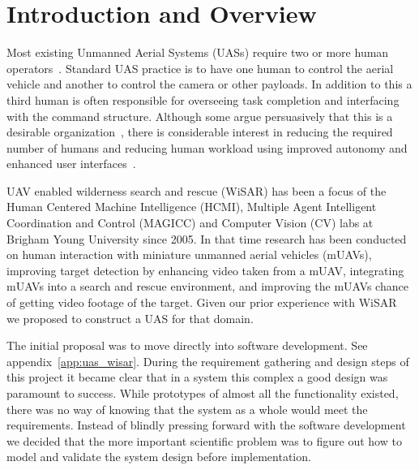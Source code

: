 \chapter{Introduction and Overview}

Most existing Unmanned Aerial Systems (UASs) require two or more human operators~\cite{GoodrichMorse2008,MurphyStoverPrattGriffin2006}. Standard UAS practice is to have one human to control the aerial vehicle and another to control the camera or other payloads. In addition to this a third human is often responsible for overseeing task completion and interfacing with the command structure. Although some argue persuasively that this is a desirable organization~\cite{MurphyBurke2010}, there is considerable interest in reducing the required number of humans and reducing human workload using improved autonomy and enhanced user interfaces~\cite{Cummings2007,MitchellCummings2005,goodrich2010fanout}.

UAV enabled wilderness search and rescue (WiSAR) has been a focus of the Human
Centered Machine Intelligence (HCMI), Multiple Agent Intelligent Coordination and Control (MAGICC) and Computer Vision (CV) labs at Brigham Young University since 2005.  In that time research has been conducted on human interaction with miniature unmanned aerial vehicles (mUAVs), improving target detection by enhancing video taken from a mUAV, integrating mUAVs into a search and rescue environment,
and improving the mUAVs chance of getting video footage of the target.   Given our prior experience with WiSAR~\cite{goodrich2009towards} we proposed to construct a UAS for that domain.  

The initial proposal was to move directly into software development.  See appendix~\ref{app:uas_wisar}.  During the requirement gathering and design steps of this project it became clear that in a system this complex a good design was paramount to success.  While prototypes of almost all the functionality existed, there was no way of knowing that the system as a whole would meet the requirements.  Instead of blindly pressing forward with the software development we decided that the more important scientific problem was to figure out how to model and validate the system design before implementation.

